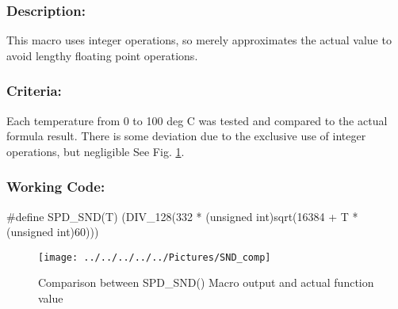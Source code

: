 \documentclass[]{article}
\begin{document}
\subsubsection{Description:}
This macro uses integer operations, so merely approximates the actual value to avoid lengthy floating point operations. 

\subsubsection{Criteria:}
Each temperature from 0 to 100 deg C was tested and compared to the actual formula result. There is some deviation due to the exclusive use of integer operations, but negligible See Fig. \ref{fig:SND_comp}.\newline 

\subsubsection{Working Code:}
\#define SPD\_SND(T) (DIV\_128(332 * (unsigned int)sqrt(16384 + T * (unsigned int)60)))

\begin{figure}
\centering
\texttt{[image: ../../../../../Pictures/SND\_comp]}
\caption{Comparison between SPD\_SND() Macro output and actual function value}
\label{fig:SND_comp}
\end{figure}
\end{document}
